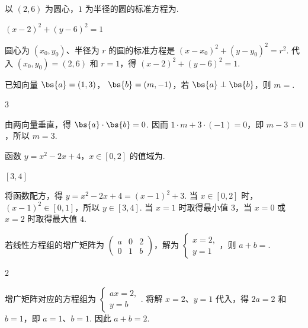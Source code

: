 \begin{problem}
以 \( (2, 6) \) 为圆心，\(1\) 为半径的圆的标准方程为\fillinblank{}.

\begin{answer}
\( (x-2)^2+(y-6)^2=1 \)
\end{answer}

\begin{solution}
圆心为 \((x_0,y_0)\)、半径为 \(r\) 的圆的标准方程是 \((x-x_0)^2+(y-y_0)^2=r^2\). 代入 \((x_0,y_0)=(2,6)\) 和 \(r=1\)，得 \((x-2)^2+(y-6)^2=1\).
\end{solution}
\end{problem}

\begin{problem}
已知向量 \( \bs{a} = (1, 3) \)， \( \bs{b} = (m, -1) \)，若 \( \bs{a} \perp \bs{b} \)，则 \( m = \)\fillinblank{}.

\begin{answer}
\(3\)
\end{answer}

\begin{solution}
由两向量垂直，得 \(\bs{a}\cdot\bs{b}=0\). 因而 \(1\cdot m+3\cdot(-1)=0\)，即 \(m-3=0\)，所以 \(m=3\).
\end{solution}
\end{problem}

\begin{problem}
函数 \( y = x^2 - 2x + 4 \)，\( x \in [0, 2] \) 的值域为\fillinblank{}.

\begin{answer}
\([3,4]\)
\end{answer}

\begin{solution}
将函数配方，得 \(y=x^2-2x+4=(x-1)^2+3\). 当 \(x\in[0,2]\) 时，\((x-1)^2\in[0,1]\)，所以 \(y\in[3,4]\). 当 \(x=1\) 时取得最小值 \(3\)，当 \(x=0\) 或 \(x=2\) 时取得最大值 \(4\).
\end{solution}
\end{problem}

\begin{problem}
若线性方程组的增广矩阵为 \( \begin{pmatrix} a & 0 & 2 \\ 0 & 1 & b \end{pmatrix} \)，解为
\(\begin{cases}
x = 2,\\
y = 1
\end{cases}\)，则 \( a + b = \)\fillinblank{}.

\begin{answer}
\(2\)
\end{answer}

\begin{solution}
增广矩阵对应的方程组为 \(
\begin{cases}
ax=2,\\
y=b
\end{cases}
\).
将解 \(x=2\)、\(y=1\) 代入，得 \(2a=2\) 和 \(b=1\)，即 \(a=1\)、\(b=1\). 因此 \(a+b=2\).
\end{solution}
\end{problem}


